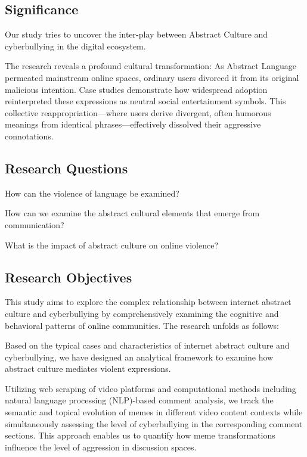 \documentclass[12pt,a4paper]{ctexart}
\begin{document}
\subsection{Significance}

Our study tries to uncover the inter-play between Abstract Culture and cyberbullying in the digital ecosystem.

The research reveals a profound cultural transformation: As Abstract Language permeated mainstream online spaces, ordinary users divorced it from its original malicious intention. Case studies demonstrate how widespread adoption reinterpreted these expressions as neutral social entertainment symbols. This collective reappropriation—where users derive divergent, often humorous meanings from identical phrases—effectively dissolved their aggressive connotations. 

\subsection{Research Questions}

How can the violence of language be examined?

How can we examine the abstract cultural elements that emerge from communication?

What is the impact of abstract culture on online violence?

\subsection{Research Objectives}

This study aims to explore the complex relationship between internet abstract culture and cyberbullying by comprehensively examining the cognitive and behavioral patterns of online communities. The research unfolds as follows:

Based on the typical cases and characteristics of internet abstract culture and cyberbullying, we have designed an analytical framework to examine how abstract culture mediates violent expressions.

Utilizing web scraping of video platforms and computational methods including natural language processing (NLP)-based comment analysis, we track the semantic and topical evolution of memes in different video content contexts while simultaneously assessing the level of cyberbullying in the corresponding comment sections. This approach enables us to quantify how meme transformations influence the level of aggression in discussion spaces.
\end{document}
